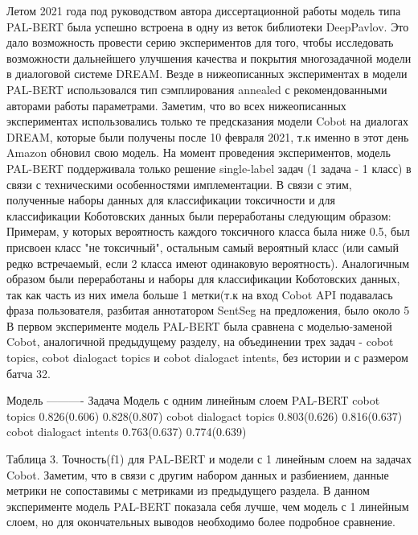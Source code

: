Летом 2021 года под руководством автора диссертационной работы модель типа PAL-BERT \cite{Stickland_Murray_2019} была успешно встроена в одну из веток библиотеки DeepPavlov. Это дало возможность провести серию экспериментов для того, чтобы исследовать возможности дальнейшего улучшения качества и покрытия многозадачной модели в диалоговой системе DREAM. Везде в нижеописанных экспериментах в модели PAL-BERT использовался  тип сэмплирования annealed с рекомендованными авторами работы \cite{Stickland_Murray_2019} параметрами.
Заметим, что во всех нижеописанных экспериментах использовались только те предсказания модели Cobot на диалогах DREAM, которые были получены после 10 февраля 2021, т.к именно в этот день Amazon обновил свою модель.
На момент проведения экспериментов, модель PAL-BERT поддерживала только решение single-label задач (1 задача - 1 класс) в связи с техническими особенностями имплементации. В связи с этим, полученные наборы данных для классификации токсичности и для классификации Коботовских данных были переработаны следующим образом:
Примерам, у которых вероятность каждого токсичного класса была ниже 0.5, был присвоен класс "не токсичный", остальным самый вероятный класс (или самый редко встречаемый, если 2 класса имеют одинаковую вероятность).
Аналогичным образом были переработаны и наборы для классификации Коботовских данных, так как часть из них имела больше 1 метки(т.к на вход Cobot API  подавалась фраза пользователя, разбитая аннотатором SentSeg на предложения, было около 5%
В первом эксперименте модель PAL-BERT была сравнена с моделью-заменой Cobot, аналогичной предыдущему разделу, на объединении трех задач - cobot topics, cobot dialogact topics и cobot dialogact intents, без истории и с размером батча 32.


Модель
—-------
Задача
Модель с одним линейным слоем
PAL-BERT
cobot topics
0.826(0.606)
0.828(0.807)
cobot dialogact topics
0.803(0.626) 
0.816(0.637)
cobot dialogact intents
0.763(0.637)
0.774(0.639)

Таблица 3. Точность(f1) для PAL-BERT и модели с 1 линейным слоем на задачах Cobot. Заметим, что в связи с другим набором данных и разбиением, данные метрики не сопоставимы с метриками из предыдущего раздела.
В данном эксперименте модель PAL-BERT показала себя лучше, чем модель с 1 линейным слоем, но для окончательных выводов необходимо более подробное сравнение.





